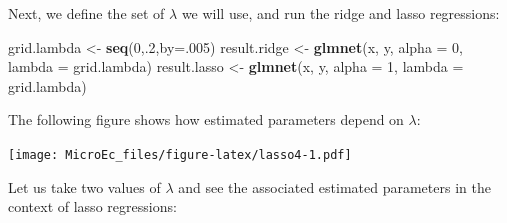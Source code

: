 \documentclass[
  12pt,
]{book}
\newenvironment{Shaded}{\begin{snugshade}}{\end{snugshade}}
\newcommand{\AttributeTok}[1]{\textcolor[rgb]{0.13,0.29,0.53}{#1}}
\newcommand{\DecValTok}[1]{\textcolor[rgb]{0.00,0.00,0.81}{#1}}
\newcommand{\FunctionTok}[1]{\textcolor[rgb]{0.13,0.29,0.53}{\textbf{#1}}}
\newcommand{\NormalTok}[1]{#1}
\newcommand{\OtherTok}[1]{\textcolor[rgb]{0.56,0.35,0.01}{#1}}
\newcommand{\SpecialCharTok}[1]{\textcolor[rgb]{0.81,0.36,0.00}{\textbf{#1}}}
\newcommand{\StringTok}[1]{\textcolor[rgb]{0.31,0.60,0.02}{#1}}
\theoremstyle{definition}
\theoremstyle{definition}
\theoremstyle{definition}
\theoremstyle{definition}
\theoremstyle{remark}
\begin{document}
Next, we define the set of \(\lambda\) we will use, and run the ridge and lasso regressions:

\begin{Shaded}
\begin{Highlighting}[]
\NormalTok{grid.lambda }\OtherTok{\textless{}{-}} \FunctionTok{seq}\NormalTok{(}\DecValTok{0}\NormalTok{,.}\DecValTok{2}\NormalTok{,}\AttributeTok{by=}\NormalTok{.}\DecValTok{005}\NormalTok{)}
\NormalTok{result.ridge }\OtherTok{\textless{}{-}} \FunctionTok{glmnet}\NormalTok{(x, y, }\AttributeTok{alpha =} \DecValTok{0}\NormalTok{, }\AttributeTok{lambda =}\NormalTok{ grid.lambda)}
\NormalTok{result.lasso }\OtherTok{\textless{}{-}} \FunctionTok{glmnet}\NormalTok{(x, y, }\AttributeTok{alpha =} \DecValTok{1}\NormalTok{, }\AttributeTok{lambda =}\NormalTok{ grid.lambda)}
\end{Highlighting}
\end{Shaded}

The following figure shows how estimated parameters depend on \(\lambda\):

\begin{Shaded}
\end{Shaded}

\texttt{[image: MicroEc\_files/figure-latex/lasso4-1.pdf]}

Let us take two values of \(\lambda\) and see the associated estimated parameters in the context of lasso regressions:
\end{document}
